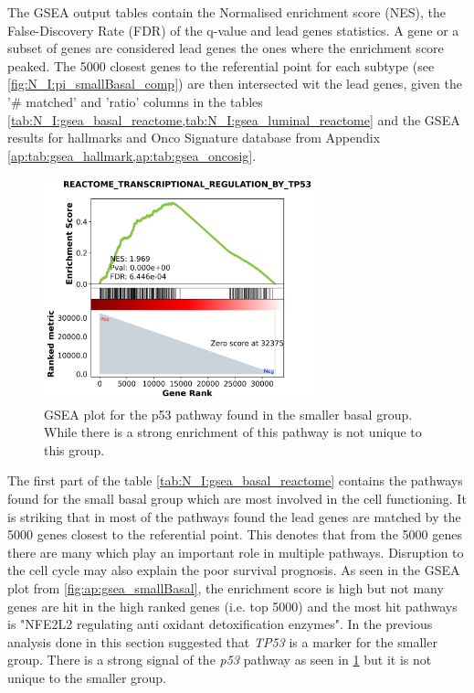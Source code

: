 The GSEA output tables contain the Normalised enrichment score (NES), the False-Discovery Rate (FDR) of the q-value and lead genes statistics. A gene or a subset of genes are considered lead genes the ones where the enrichment score peaked. The 5000 closest genes to the referential point for each subtype (see \cref{fig:N_I:pi_smallBasal_comp}) are then intersected wit the lead genes, given the '\# matched' and 'ratio' columns in the tables \cref{tab:N_I:gsea_basal_reactome,tab:N_I:gsea_luminal_reactome} and the GSEA results for hallmarks and Onco Signature database from Appendix \cref{ap:tab:gsea_hallmark,ap:tab:gsea_oncosig}.

\begin{figure}[!htb]   
\centering
\includegraphics[width=0.7\textwidth,height=0.7\textheight,keepaspectratio]{Sections/Network_I/Resources/selective_pruning/gsea/REACTOME_TRANSCRIPTIONAL_REGULATION_BY_TP53.png}
  \caption{GSEA plot for the p53 pathway found in the smaller basal group. While there is a strong enrichment of this pathway is not unique to this group.}
\label{fig:N_I:gsea_p53_smallBasal}
\end{figure}

The first part of the table \cref{tab:N_I:gsea_basal_reactome} contains the pathways found for the small basal group which are most involved in the cell functioning. It is striking that in most of the pathways found the lead genes are matched by the 5000 genes closest to the referential point. This denotes that from the 5000 genes there are many which play an important role in multiple pathways. Disruption to the cell cycle may also explain the poor survival prognosis. As seen in the GSEA plot from \cref{fig:ap:gsea_smallBasal}, the enrichment score is high but not many genes are hit in the high ranked genes (i.e. top 5000) and the most hit pathways is "NFE2L2 regulating anti oxidant detoxification enzymes". In the previous analysis done in this section suggested that \textit{TP53} is a marker for the smaller group. There is a 
strong signal of the \textit{p53} pathway as seen in \cref{fig:N_I:gsea_p53_smallBasal} but it is not unique to the smaller group.

